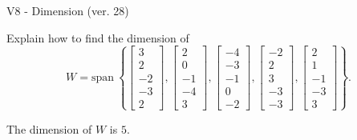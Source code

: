 \begin{exercise}
  \begin{exerciseTitle}V8 - Dimension (ver. 28)\end{exerciseTitle}
  \begin{exerciseStatement}
    Explain how to find the dimension of 
\[W=\mathrm{span}\ \left\{\left[\begin{array}{r}
3 \\
2 \\
-2 \\
-3 \\
2
\end{array}\right] , \left[\begin{array}{r}
2 \\
0 \\
-1 \\
-4 \\
3
\end{array}\right] , \left[\begin{array}{r}
-4 \\
-3 \\
-1 \\
0 \\
-2
\end{array}\right] , \left[\begin{array}{r}
-2 \\
2 \\
3 \\
-3 \\
-3
\end{array}\right] , \left[\begin{array}{r}
2 \\
1 \\
-1 \\
-3 \\
3
\end{array}\right]\right\}.\]



  \end{exerciseStatement}
  \begin{exerciseAnswer}
   The dimension of \(W\) is  \(5\).
  


  \end{exerciseAnswer}
\end{exercise}